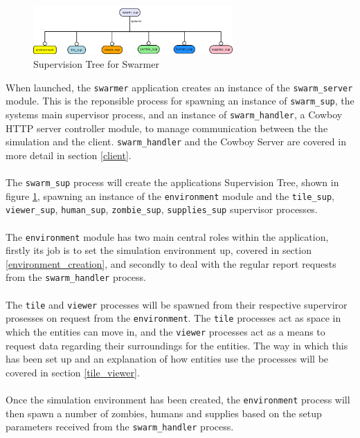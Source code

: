 \documentclass[10pt, a4paper, conference, compsocconf]{IEEEtran}
\begin{document}
\begin{figure}[h]
  \centering
  \includegraphics[width=3in]{../img/supervisor.png}
\caption{Supervision Tree for Swarmer}
    \label{fig:sup_tree}
\end{figure}

When launched, the \verb+swarmer+ application creates an instance of the \verb+swarm_server+ module. This is the reponsible process for spawning an instance of \verb+swarm_sup+, the systems main supervisor process, and an instance of \verb+swarm_handler+, a Cowboy HTTP server \cite{cowboy} controller module, to manage communication between the the simulation and the client. \verb+swarm_handler+ and the Cowboy Server are covered in more detail in section \ref{client}.\\
\\
The \verb+swarm_sup+ process will create the applications Supervision Tree, shown in figure \ref{fig:sup_tree}, spawning an instance of the \verb+environment+ module and the \verb+tile_sup+, \verb+viewer_sup+, \verb+human_sup+, \verb+zombie_sup+, \verb+supplies_sup+ supervisor processes.\\
\\
The \verb+environment+ module has two main central roles within the application, firstly its job is to set the simulation environment up, covered in section \ref{environment_creation}, and secondly to deal with the regular report requests from the \verb+swarm_handler+ process.\\
\\
The \verb+tile+ and \verb+viewer+ processes will be spawned from their respective superviror prosesses on request from the \verb+environment+. The \verb+tile+ processes act as space in which the entities can move in, and the \verb+viewer+ processes act as a means to request data regarding their surroundings for the entities. The way in which this has been set up and an explanation of how entities use the processes will be covered in section \ref{tile_viewer}.\\
\\
Once the simulation environment has been created, the \verb+environment+ process will then spawn a number of zombies, humans and supplies based on the setup parameters received from the \verb+swarm_handler+ process.\\
\end{document}
